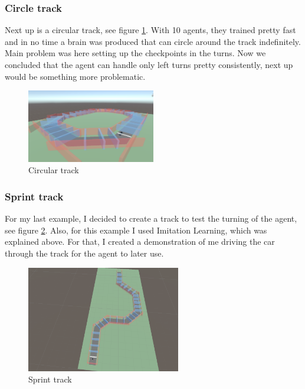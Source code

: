 \documentclass[a4paper, 12pt]{book}
\begin{document}
\subsubsection{Circle track}

Next up is a circular track, see figure \ref{CircleTrack}. With 10 agents, they trained pretty fast and in no time a brain was produced that can circle around the track indefinitely. Main problem was here setting up the checkpoints in the turns. Now we concluded that the agent can handle only left turns pretty consistently, next up would be something more problematic.

\begin{figure}[h]
\begin{center}
\includegraphics[width=0.5\textwidth]{Images/CircleTrack.png}
\end{center}
\caption{Circular track}
\label{CircleTrack}
\end{figure}

\clearpage

\subsubsection{Sprint track}

For my last example, I decided to create a track to test the turning of the agent, see figure \ref{SprintTrack}. Also, for this example I used Imitation Learning, which was explained above. For that, I created a demonstration of me driving the car through the track for the agent to later use.

\begin{figure}[h]
\begin{center}
\includegraphics[width=0.6\textwidth]{Images/SprintTrack.png}
\end{center}
\caption{Sprint track}
\label{SprintTrack}
\end{figure}
\end{document}

